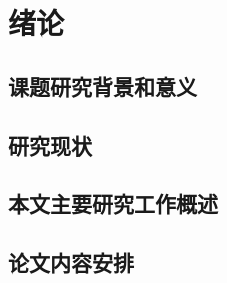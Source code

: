 \chapter{绪论}\label{chap:introduction}

\section{课题研究背景和意义}






\section{研究现状}




\section{本文主要研究工作概述}




\section{论文内容安排}











